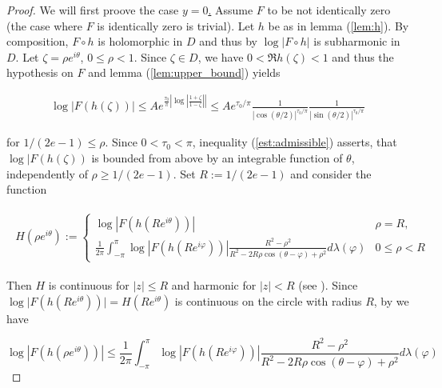 \begin{proof}
	We will first proove the case \underline{$y = 0$.} Assume $F$ to be not identically zero (the case where $F$ is identically zero is trivial). Let $h$ be as in lemma (\ref{lem:h}). By composition, $F \circ h$ is holomorphic in $D$ and thus by \cite[336]{rudin:rc_analysis:1987} $\log\vert F \circ h \vert$ is subharmonic in $D$. Let $\zeta = \rho e^{i\theta}$, $0 \leqslant \rho < 1$. Since $\zeta \in D$, we have $0 < \Re h(\zeta) < 1$ and thus the hypothesis on $F$ and lemma (\ref{lem:upper_bound}) yields

\begin{gather}
	\log \vert F(h(\zeta)) \vert \leqslant Ae^{\frac{\tau_0}{\pi}\left| \log\left| \frac{1 + \zeta}{1 - \zeta}\right|\right|} \leqslant Ae^{\tau_0/\pi}\frac{1}{\left| \cos(\theta/2) \right|^{\tau_0/\pi}}\frac{1}{\left| \sin(\theta/2) \right|^{\tau_0/\pi}}
	\label{est:admissible}
\end{gather}

	for $1/(2e - 1) \leqslant \rho$. Since $0 < \tau_0 < \pi$, inequality (\ref{est:admissible}) asserts, that $\log \vert F(h(\zeta))$ is bounded from above by an integrable function of $\theta$, independently of $\rho \geqslant 1/(2e - 1)$. Set $R := 1/(2e - 1)$ and consider the function
	 
\begin{gather*}
	\begin{aligned}
		H(\rho e^{i\theta}):= \begin{cases}
			\log \left| F(h(Re^{i\theta}))\right| & \rho = R,\\
			\displaystyle \frac{1}{2\pi} \int_{-\pi}^\pi \log\left| F(h(Re^{i\varphi}))\right| \frac{R^2 - \rho^2}{R^2 - 2R\rho \cos(\theta - \varphi) + \rho^2} d\lambda(\varphi) & 0 \leqslant \rho < R
	\end{cases}
	\end{aligned}
\end{gather*}

Then $H$ is continuous for $\vert z \vert \leqslant R$ and harmonic for $\vert z \vert < R$ (see \cite[234--235]{rudin:rc_analysis:1987}). Since $\log\vert F(h(Re^{i\theta}))\vert = H(Re^{i\theta})$ is continuous on the circle with radius $R$, by \cite[336]{rudin:rc_analysis:1987} we have

\begin{equation*}
	\log\left| F(h(\rho e^{i\theta}))\right| \leqslant \frac{1}{2\pi} \int_{-\pi}^\pi \log\left| F(h(Re^{i\varphi}))\right| \frac{R^2 - \rho^2}{R^2 - 2R\rho\cos(\theta - \varphi) + \rho^2} d\lambda(\varphi) 
\end{equation*}


\end{proof}
